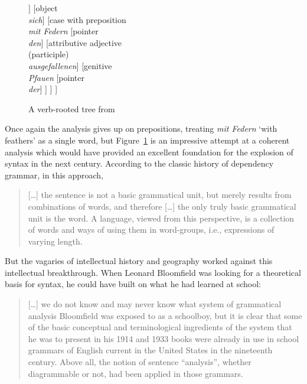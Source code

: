 \documentclass[output=paper,biblatex,babelshorthands,newtxmath,draftmode,colorlinks,citecolor=brown]{langscibook}
\begin{document}
\begin{figure}
	\centering
\begin{forest}
[finite verb\\\emph{schmückte}
	[subject word\\\emph{Krähe}
		[counter\\\emph{eine}]
		[attributive adjective\\\emph{stolze}]
	]
	[object\\\emph{sich}]
	[case with preposition\\\emph{mit Federn}
		[pointer\\\emph{den}]
		[attributive adjective\\(participle)\\\emph{ausgefallenen}]
		[genitive\\\emph{Pfauen}
			[pointer\\\emph{der}]
		]
	]
]
\end{forest}
\caption{A verb-rooted tree from \citet[]{Kern1884a-u}}
\label{fig:4}
\end{figure}


Once again the analysis gives up on prepositions, treating \emph{mit Federn} `with feathers' as a
single word, but Figure~\ref{fig:4} is an impressive attempt at a coherent analysis which would have
provided an excellent foundation for the explosion of syntax in the next century. According to the
classic history of dependency grammar, in this approach,

\begin{quotation} [\dots] the sentence is not a basic grammatical unit, but merely results from
  combinations of words, and therefore [\dots] the only truly basic grammatical unit is the word. A
  language, viewed from this perspective, is a collection of words and ways of using them in
  word-groups, i.e., expressions of varying length. \citep{Percival2007}
\end{quotation}

But the vagaries of intellectual history and geography worked against this intellectual
breakthrough. When Leonard Bloomfield was looking for a theoretical basis for syntax, he could have
built on what he had learned at school:

\begin{quotation} [\dots] we do not know and may never know what system of grammatical analysis
  Bloomfield was exposed to as a schoolboy, but it is clear that some of the basic conceptual and
  terminological ingredients of the system that he was to present in his 1914 and 1933 books were
  already in use in school grammars of English current in the United States in the nineteenth
  century. Above all, the notion of sentence ``analysis'', whether diagrammable or not, had been
  applied in those grammars. \citep{Percival2007}
\end{quotation}
\end{document}
